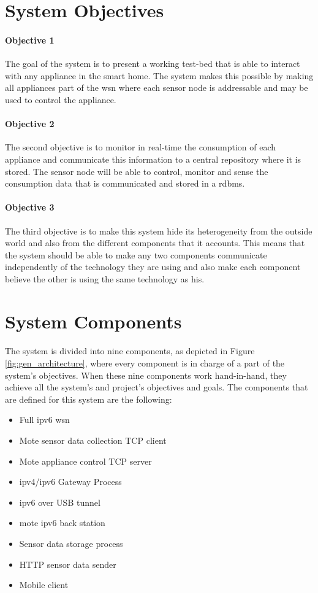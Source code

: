 \documentclass[12pt,a4paper,final]{report}
\begin{document}
\section{System Objectives}
\paragraph{Objective 1}
The goal of the system is to present a working test-bed that is able to interact with any appliance in the smart home. The system makes this possible by making all appliances part of the \gls{wsn} where each sensor node is addressable and may be used to control the appliance.
\paragraph{Objective 2}
The second objective is to monitor in real-time the consumption of each appliance and communicate this information to a central repository where it is stored. The sensor node will be able to control, monitor and sense the consumption data that is communicated and stored in a \gls{rdbms}.
\paragraph{Objective 3}
The third objective is to make this system hide its heterogeneity from the outside world and also from the different components that it accounts. This means that the system should be able to make any two components communicate independently of the technology they are using and also make each component believe the other is using the same technology as his. 

\section{System Components}
\paragraph{}
The system is divided into nine components, as depicted in Figure \ref{fig:gen_architecture}, where every component is in charge of a part of the system's objectives. When these nine components work hand-in-hand, they achieve all the system's and project's objectives and goals. The components that are defined for this system are the following:

\begin{itemize}
\item Full \gls{ipv6} \gls{wsn}
\item Mote sensor data collection TCP client
\item Mote appliance control TCP server
\item \gls{ipv4}/\gls{ipv6} Gateway Process
\item \gls{ipv6} over USB tunnel
\item mote \gls{ipv6} back station
\item Sensor data storage process
\item HTTP sensor data sender
\item Mobile client
\end{itemize}
\end{document}
